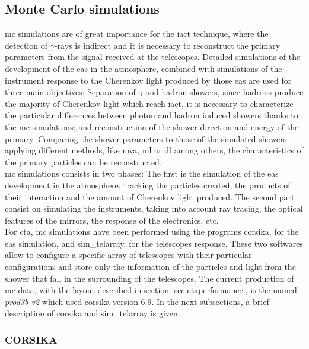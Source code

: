 \documentclass[main.tex]{subfiles}
\begin{document}
\subsection{Monte Carlo simulations}

\gls{mc} simulations are of great importance for the \gls{iact} technique, where the detection of $\gamma$-rays is indirect and it is necessary to reconstruct the primary parameters from the signal received at the telescopes. Detailed simulations of the development of the \gls{eas} in the atmosphere, combined with simulations of the instrument response to the Cherenkov light produced by those \gls{eas} are used for three main objectives: Separation of $\gamma$ and hadron showers, since hadrons produce the majority of Cherenkov light which reach \gls{iact}, it is necessary to characterize the particular differences between photon and hadron induced showers thanks to the \gls{mc} simulations; and reconstruction of the shower direction and energy of the primary. Comparing the shower parameters to those of the simulated showers applying different methods, like \gls{mva}, \gls{ml} or \gls{dl} among others, the characteristics of the primary particles can be reconstructed.\\
\gls{mc} simulations consists in two phases: The first is the simulation of the \gls{eas} development in the atmosphere, tracking the particles created, the products of their interaction and the amount of Cherenkov light produced. The second part consist on simulating the instruments, taking into account ray tracing, the optical features of the mirrors, the response of the electronics, etc.\\
For \gls{cta}, \gls{mc} simulations have been performed using the programs \gls{corsika}, for the \gls{eas} simulation, and sim\_telarray, for the telescopes response. These two softwares allow to configure a specific array of telescopes with their particular configurations and store only the information of the particles and light from the shower that fall in the surrounding of the telescopes. The current production of \gls{mc} data, with the layout described in section \ref{sec:ctaperformance}, is the named \textit{prod3b-v2} which used \gls{corsika} version 6.9. In the next subsections, a brief description of \gls{corsika} and sim\_telarray is given.

\subsubsection{CORSIKA}
\end{document}
